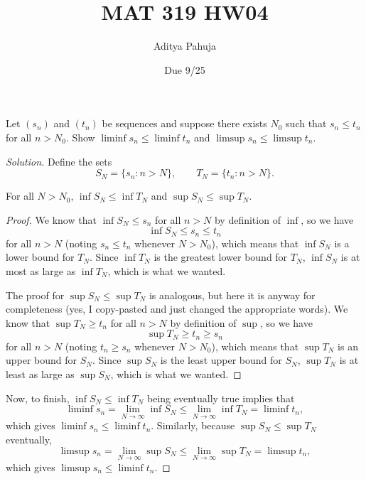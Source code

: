 \documentclass[11pt]{scrartcl}
\title{\vspace{-2em}MAT 319 HW04}
\author{\large Aditya Pahuja}
\date{\large Due 9/25}
\theoremstyle{problem}
\newenvironment{problem}[1]
{\renewcommand\theinnercustomthm{#1}\innercustomthm}
{\endinnercustomthm}
\theoremstyle{remark}
\newenvironment{soln}{\begin{proof}[Solution]}{\end{proof}}
\begin{document}
\maketitle

\begin{problem}{12.1}
	Let $(s_n)$ and $(t_n)$ be sequences and suppose there exists $N_0$
	such that $s_n \le t_n$ for all $n > N_0$.
	Show $\liminf s_n \le \liminf t_n$ and $\limsup s_n \le \limsup t_n$.
\end{problem}

\begin{soln}
	Define the sets
	\[S_N = \{s_n : n > N\},\qquad
	T_N = \{t_n : n > N\}.\]

	\begin{claim*}
		For all $N > N_0$, $\inf S_N \le \inf T_N$ and $\sup S_N \le \sup T_N$.
	\end{claim*}
	\begin{proof}
		We know that $\inf S_N \le s_n$ for all $n > N$ by definition of $\inf$,
		so we have
		\[\inf S_N \le s_n \le t_n\]
		for all $n > N$ (noting $s_n \le t_n$ whenever $N > N_0$),
		which means that $\inf S_N$ is a lower bound for $T_N$.
		Since $\inf T_N$ is the greatest lower bound for $T_N$,
		$\inf S_N$ is at most as large as $\inf T_N$, which is what we wanted.
		
		The proof for $\sup S_N \le \sup T_N$ is analogous,
		but here it is anyway for completeness
		(yes, I copy-pasted and just changed the appropriate words).
		We know that $\sup T_N \ge t_n$ for all $n > N$ by definition of $\sup$,
		so we have
		\[\sup T_N \ge t_n \ge s_n\]
		for all $n > N$ (noting $t_n \ge s_n$ whenever $N > N_0$),
		which means that $\sup T_N$ is an upper bound for $S_N$.
		Since $\sup S_N$ is the least upper bound for $S_N$,
		$\sup T_N$ is at least as large as $\sup S_N$, which is what we wanted.
	\end{proof}

	Now, to finish, $\inf S_N \le \inf T_N$ being eventually true implies that
	\[\liminf s_n = \lim_{N\to\infty} \inf S_N \le \lim_{N\to\infty} \inf T_N
	= \liminf t_n,\]
	which gives $\liminf s_n \le \liminf t_n$.
	Similarly, because $\sup S_N \le \sup T_N$ eventually,
	\[\limsup s_n = \lim_{N\to\infty} \sup S_N \le \lim_{N\to\infty} \sup T_N
	= \limsup t_n,\]
	which gives $\limsup s_n \le \liminf t_n$.
\end{soln}
\end{document}
